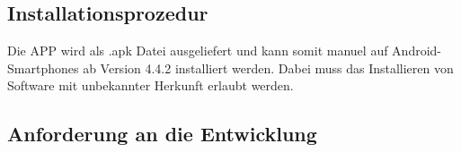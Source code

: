 %
%
%
%


\subsection{Installationsprozedur}

Die \acs{APP} wird als .apk Datei ausgeliefert und kann somit manuel auf Android-Smartphones ab Version 4.4.2 installiert werden.
Dabei muss das Installieren von Software mit unbekannter Herkunft erlaubt werden.


%


\subsection{\textbf{Anforderung an die Entwicklung}}

